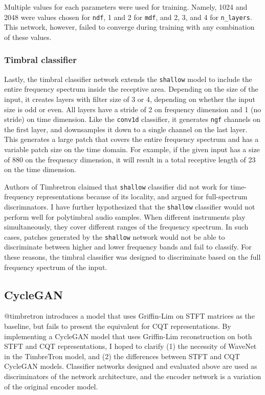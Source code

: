 \documentclass[12pt,a4paper,]{report}
\begin{document}
Multiple values for each parameters were used for training. Namely, 1024
and 2048 were values chosen for \texttt{ndf}, 1 and 2 for \texttt{mdf},
and 2, 3, and 4 for \texttt{n\_layers}. This network, however, failed to
converge during training with any combination of these values.

\hypertarget{timbral-classifier}{%
\subsubsection{Timbral classifier}\label{timbral-classifier}}

Lastly, the timbral classifier network extends the \texttt{shallow}
model to include the entire frequency spectrum inside the receptive
area. Depending on the size of the input, it creates layers with filter
size of 3 or 4, depending on whether the input size is odd or even. All
layers have a stride of 2 on frequency dimension and 1 (no stride) on
time dimension. Like the \texttt{conv1d} classifier, it generates
\texttt{ngf} channels on the first layer, and downsamples it down to a
single channel on the last layer. This generates a large patch that
covers the entire frequency spectrum and has a variable patch size on
the time domain. For example, if the given input has a size of 880 on
the frequency dimension, it will result in a total receptive length of
23 on the time dimension.

Authors of Timbretron claimed that \texttt{shallow} classifier did not
work for time-frequency representations because of its locality, and
argued for full-spectrum discrimnators. I have further hypothesized that
the \texttt{shallow} classifier would not perform well for polytimbral
audio samples. When different instruments play simultaneously, they
cover different ranges of the frequency spectrum. In such cases, patches
generated by the \texttt{shallow} network would not be able to
discriminate between higher and lower frequency bands and fail to
classify. For these reasons, the timbral classifier was designed to
discriminate based on the full frequency spectrum of the input.

\hypertarget{cyclegan-1}{%
\subsection{CycleGAN}\label{cyclegan-1}}

@timbretron introduces a model that uses Griffin-Lim on STFT matrices as
the baseline, but fails to present the equivalent for CQT
representations. By implementing a CycleGAN model that uses Griffin-Lim
reconstruction on both STFT and CQT representations, I hoped to clarify
(1) the necessity of WaveNet in the TimbreTron model, and (2) the
differences between STFT and CQT CycleGAN models. Classifier networks
designed and evaluated above are used as discriminators of the network
architecture, and the encoder network is a variation of the original
encoder model.
\end{document}
